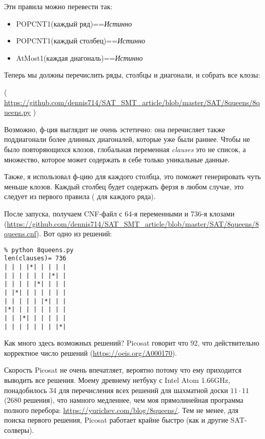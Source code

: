Эти правила можно перевести так:

\begin{itemize}
\item POPCNT1(каждый ряд)==\textit{Истинно}

\item POPCNT1(каждый столбец)==\textit{Истинно}

\item AtMost1(каждая диагональ)==\textit{Истинно}
\end{itemize}

Теперь мы должны перечислить ряды, столбцы и диагонали, и собрать все клозы:


( \url{https://github.com/dennis714/SAT_SMT_article/blob/master/SAT/8queens/8queens.py} )

Возможно, ф-ция  выглядит не очень эстетично:
она перечисляет также поддиагонали более длинных диагоналей, которые уже были раннее.
Чтобы не было повторяющихся клозов, глобальная переменная \textit{clauses} это не список, а множество,
которое может содержать в себе только уникальные данные.

Также, я использовал ф-цию  для каждого столбца, это поможет генерировать чуть меньше клозов.
Каждый столбец будет содержать ферзя в любом случае, это следует из первого правила ( для каждого ряда).

После запуска, получаем CNF-файл с 64-я переменными и 736-я клозами (\url{https://github.com/dennis714/SAT_SMT_article/blob/master/SAT/8queens/8queens.cnf}).
Вот одно из решений:

\begin{lstlisting}
% python 8queens.py
len(clauses)= 736
| | | |*| | | | |
| | | | | | |*| |
| | | | |*| | | |
| |*| | | | | | |
| | | | | |*| | |
|*| | | | | | | |
| | |*| | | | | |
| | | | | | | |*|
\end{lstlisting}

Как много здесь возможных решений?
Picosat говорит что 92, что действительно корректное число решений (\url{https://oeis.org/A000170}).

Скорость Picosat не очень впечатляет, вероятно потому что ему приходится выводить все решения.
Моему древнему нетбуку с Intel Atom 1.66GHz, понадобилось 34 для перечисления всех решений для шахматной доски
$11 \cdot 11$ 
(2680 решения),
что намного медленнее, чем моя прямолинейная программа полного перебора: \url{https://yurichev.com/blog/8queens/}.
Тем не менее, для поиска первого решения, Picosat работает крайне быстро (как и другие SAT-солверы).

